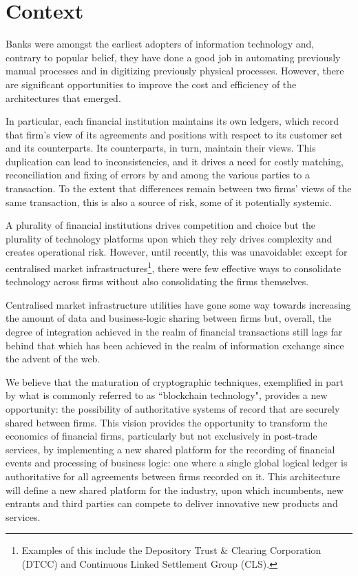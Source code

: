 \documentclass{article}
\begin{document}
\section{Context}
Banks were amongst the earliest adopters of information technology and, contrary to popular belief, they have done a good job in automating previously manual processes and in digitizing previously physical processes. However, there are significant opportunities to improve the cost and efficiency of the architectures that emerged. 

In particular, each financial institution maintains its own ledgers, which record that firm's view of its agreements and positions with respect to its customer set and its counterparts. Its counterparts, in turn, maintain their views. This duplication can lead to inconsistencies, and it drives a need for costly matching, reconciliation and fixing of errors by and among the various parties to a transaction. To the extent that differences remain between two firms' views of the same transaction, this is also a source of risk, some of it potentially systemic.

A plurality of financial institutions drives competition and choice but the plurality of technology platforms upon which they rely drives complexity and creates operational risk. However, until recently, this was unavoidable: except for centralised market infrastructures\footnote{Examples of this include the Depository Trust \& Clearing Corporation (DTCC) and Continuous Linked Settlement Group (CLS).}, there were few effective ways to consolidate technology across firms without also consolidating the firms themselves.

Centralised market infrastructure utilities have gone some way towards increasing the amount of data and business-logic sharing between firms but, overall, the degree of integration achieved in the realm of financial transactions still lags far behind that which has been achieved in the realm of information exchange since the advent of the web. \cite{IT}

We believe that the maturation of cryptographic techniques, exemplified in part by what is commonly referred to as ``blockchain technology", provides a new opportunity: the possibility of authoritative systems of record that are securely shared between firms. This vision provides the opportunity to transform the economics of financial firms, particularly but not exclusively in post-trade services, by implementing a new shared platform for the recording of financial events and processing of business logic: one where a single global logical ledger is authoritative for all agreements between firms recorded on it. This architecture will define a new shared platform for the industry, upon which incumbents, new entrants and third parties can compete to deliver innovative new products and services. 
\end{document}

